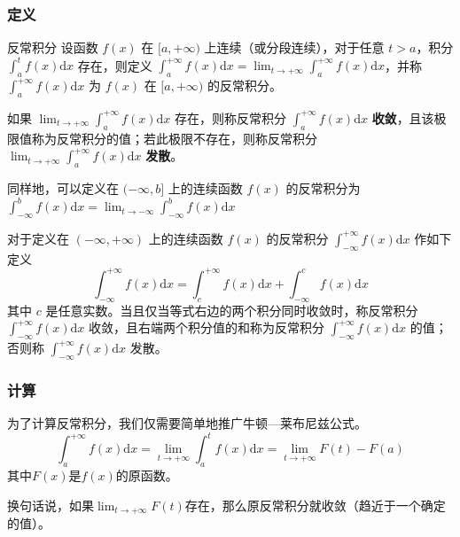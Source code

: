 \subsubsection{定义}
\begin{definition}{反常积分}
设函数 $f(x)$ 在 $[a, +\infty)$ 上连续（或分段连续），对于任意 $t>a$，积分 $\displaystyle \int^t_af(x)\mathrm{d} x$ 存在，则定义 $\displaystyle \int ^{+\infty}_a f(x)\mathrm{d} x=\lim_{t\rightarrow+\infty }\int _a^{+\infty}f(x)\mathrm{d} x$，并称 $\displaystyle \int ^{+\infty}_a f(x)\mathrm{d} x $ 为 $f(x)$ 在 $[a, +\infty)$ 的反常积分。

如果 $\displaystyle \lim_{t\rightarrow+\infty }\int _a^{+\infty}f(x)\mathrm{d} x$ 存在，则称反常积分 $\displaystyle \int ^{+\infty}_a f(x)\mathrm{d} x$ \textbf{收敛}，且该极限值称为反常积分的值；若此极限不存在，则称反常积分 $\displaystyle \lim_{t\rightarrow+\infty }\int _a^{+\infty}f(x)\mathrm{d} x$ \textbf{发散}。
\end{definition}

同样地，可以定义在 $(-\infty,b]$ 上的连续函数 $f(x)$ 的反常积分为 $\displaystyle \int ^b _{-\infty}f(x)\mathrm{d} x=\lim_{t\rightarrow-\infty }\int ^b _{-\infty}f(x)\mathrm{d} x$

对于定义在 $(-\infty,+\infty )$ 上的连续函数 $f(x)$ 的反常积分 $\displaystyle \int ^{+\infty}_{-\infty}f(x)\mathrm{d} x$ 作如下定义
$$\displaystyle \int ^{+\infty}_{-\infty}f(x)\mathrm{d} x=\displaystyle \int ^{+\infty}_c f(x)\mathrm{d} x+\displaystyle \int ^c _{-\infty}f(x)\mathrm{d} x$$
其中 $c$ 是任意实数。当且仅当等式右边的两个积分同时收敛时，称反常积分 $\displaystyle \int ^{+\infty}_{-\infty}f(x)\mathrm{d} x$ 收敛，且右端两个积分值的和称为反常积分 $\displaystyle \int ^{+\infty}_{-\infty}f(x)\mathrm{d} x$ 的值；否则称 $\displaystyle \int ^{+\infty}_{-\infty}f(x)\mathrm{d} x$ 发散。

\subsubsection{计算}
为了计算反常积分，我们仅需要简单地推广牛顿—莱布尼兹公式。
\begin{equation}
\displaystyle \int ^{+\infty}_a f(x)\mathrm{d} x=\lim_{t\rightarrow+\infty }\int _a^{t}f(x)\mathrm{d} x
=\lim_{t\rightarrow+\infty }F(t) - F(a)
\end{equation}
其中$F(x)$是$f(x)$的原函数。

换句话说，如果$\lim_{t\rightarrow+\infty } F(t)$存在，那么原反常积分就收敛（趋近于一个确定的值）。

